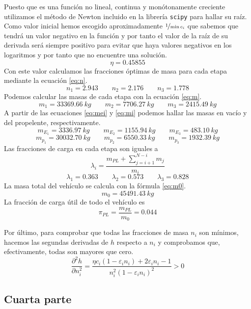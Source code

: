 \documentclass{article}
\begin{document}
Puesto que es una función no lineal, continua y monótonamente creciente utilizamos el método de Newton incluido en la librería \verb|scipy| para hallar su raíz. Como valor inicial hemos escogido aproximadamente $\nicefrac{1}{\min{c_i}}$ que sabemos que tendrá un valor negativo en la función y por tanto el valor de la raíz de su derivada será siempre positivo para evitar que haya valores negativos en los logaritmos y por tanto que no encuentre una solución.
\[ \eta = \num{0.45855} \]
Con este valor calculamos las fracciones óptimas de masa para cada etapa mediante la ecuación \ref{eq:n}.
\[ n_1 = \num{2.943} \qquad n_2 = \num{2.176} \qquad n_3 = \num{1.778} \]
Podemos calcular las masas de cada etapa con la ecuación \ref{eq:m}.
\[ m_1 = \qty{33369.66}{kg} \qquad m_2 = \qty{7706.27}{kg} \qquad m_3 = \qty{2415.49}{kg} \]
A partir de las ecuaciones \ref{eq:mei} y \ref{eq:mi} podemos hallar las masas en vacío y del propelente, respectivamente.
\[ m_{E_1} = \qty{3336.97}{kg} \qquad m_{E_2} = \qty{1155.94}{kg} \qquad m_{E_3} = \qty{483.10}{kg} \]
\[ m_{p_1} = \qty{30032.70}{kg} \qquad m_{p_2} = \qty{6550.33}{kg} \qquad m_{p_3} = \qty{1932.39}{kg} \]
Las fracciones de carga en cada etapa  son iguales a
\begin{equation*}
    \lambda_i = \frac{m_{PL} + \sum_{j=i+1}^{N-i} m_j}{m_i}
\end{equation*}
\[ \lambda_1 = \num{0.363} \qquad \lambda_2 = \num{0.573} \qquad \lambda_3 = \num{0.828} \]
La masa total del vehículo se calcula con la fórmula \ref{eq:m0}.
\begin{equation*}
    m_0 = \qty{45491.43}{kg}
\end{equation*}
La fracción de carga útil de todo el vehículo es
\begin{equation*}
    \pi_{PL} = \frac{m_{PL}}{m_0} = \num{0.044}
\end{equation*}

Por último, para comprobar que todas las fracciones de masa $n_i$ son mínimos, hacemos las segundas derivadas de $h$ respecto a $n_i$ y comprobamos que, efectivamente, todas son mayores que cero.
\begin{equation}
    \frac{\partial^2 h}{\partial n_i^2} = \frac{\eta c_i (1 - \varepsilon_i n_i) + 2\varepsilon_i n_i - 1}{n_i^2 (1-\varepsilon_i n_i)^2} > 0
\end{equation}

\subsection{Cuarta parte}

\printbibliography[title={Referencias}]
\end{document}
